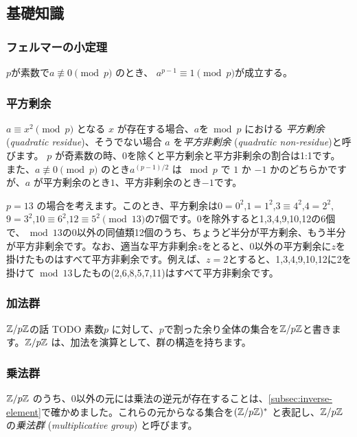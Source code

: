 \documentclass{jsarticle}
\begin{document}
  \subsection{基礎知識}
  \label{subsec:group-preliminaries}
   \subsubsection{フェルマーの小定理}
   \begin{theorem}
    \label{thm:fermats-little-theorem}
    $p$が素数で$a \not \equiv 0 \pmod p$ のとき、 $a^{p-1} \equiv 1 \pmod p$が成立する。
   \end{theorem}
   \subsubsection{平方剰余}
   \label{subsubsec:quadratic-residue}
   $a \equiv x^2 \pmod p$ となる $x$ が存在する場合、$a$を${}\bmod p$ における \emph{平方剰余} (\emph{quadratic residue})、そうでない場合 $a$ を\emph{平方非剰余} (\emph{quadratic non-residue})と呼びます。
   $p$ が奇素数の時、0を除くと平方剰余と平方非剰余の割合は1:1です。
   また、$a\not\equiv 0 \pmod p$ のとき$a^{(p-1)/2}$ は ${}\bmod p$ で $1$ か $-1$ かのどちらかですが、$a$ が平方剰余のとき$1$、平方非剰余のとき$-1$です。
   \begin{example}
    $p = 13$ の場合を考えます。このとき、平方剰余は$0=0^2$,$1=1^2$,$3\equiv 4^2$,$4=2^2$,$9=3^2$,$10\equiv 6^2$,$12 \equiv 5^2 \pmod{13}$の7個です。0を除外すると1,3,4,9,10,12の6個で、${}\bmod 13$の0以外の同値類12個のうち、ちょうど半分が平方剰余、もう半分が平方非剰余です。なお、適当な平方非剰余$z$をとると、0以外の平方剰余に$z$を掛けたものはすべて平方非剰余です。例えば、$z=2$とすると、1,3,4,9,10,12に2を掛けて${}\bmod 13$したもの(2,6,8,5,7,11)はすべて平方非剰余です。
   \end{example}
   \subsubsection{加法群}
   $\mathbb{Z}/p\mathbb{Z}$の話 TODO
   素数$p$ に対して、$p$で割った余り全体の集合を$\mathbb{Z}/p\mathbb{Z}$と書きます。$\mathbb{Z}/p\mathbb{Z}$ は、加法を演算として、群の構造を持ちます。
   \subsubsection{乗法群}
   $\mathbb{Z}/p\mathbb{Z}$ のうち、0以外の元には乗法の逆元が存在することは、\ref{subsec:inverse-element}で確かめました。これらの元からなる集合を$(\mathbb{Z}/p\mathbb{Z})^*$ と表記し、$\mathbb{Z}/p\mathbb{Z}$の\emph{乗法群}  (\emph{multiplicative group}) と呼びます。
\end{document}
